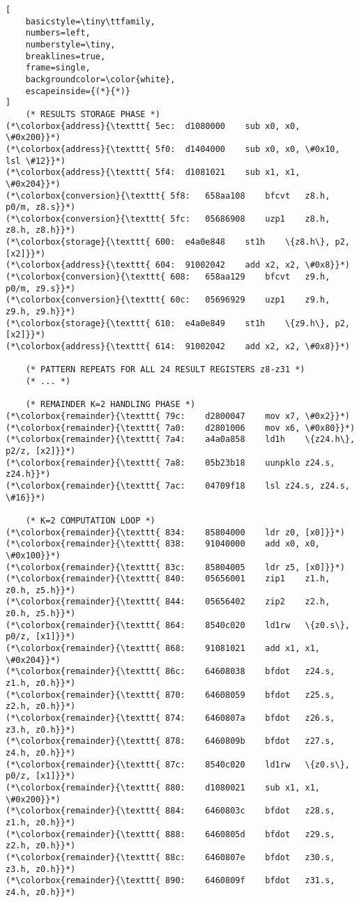 \documentclass[a4paper,10pt]{article}
\begin{document}
\begin{lstlisting}[
    basicstyle=\tiny\ttfamily,
    numbers=left,
    numberstyle=\tiny,
    breaklines=true,
    frame=single,
    backgroundcolor=\color{white},
    escapeinside={(*}{*)}
]
    (* RESULTS STORAGE PHASE *)
(*\colorbox{address}{\texttt{ 5ec:	d1080000 	sub	x0, x0, \#0x200}}*)
(*\colorbox{address}{\texttt{ 5f0:	d1404000 	sub	x0, x0, \#0x10, lsl \#12}}*)
(*\colorbox{address}{\texttt{ 5f4:	d1081021 	sub	x1, x1, \#0x204}}*)
(*\colorbox{conversion}{\texttt{ 5f8:	658aa108 	bfcvt	z8.h, p0/m, z8.s}}*)
(*\colorbox{conversion}{\texttt{ 5fc:	05686908 	uzp1	z8.h, z8.h, z8.h}}*)
(*\colorbox{storage}{\texttt{ 600:	e4a0e848 	st1h	\{z8.h\}, p2, [x2]}}*)
(*\colorbox{address}{\texttt{ 604:	91002042 	add	x2, x2, \#0x8}}*)
(*\colorbox{conversion}{\texttt{ 608:	658aa129 	bfcvt	z9.h, p0/m, z9.s}}*)
(*\colorbox{conversion}{\texttt{ 60c:	05696929 	uzp1	z9.h, z9.h, z9.h}}*)
(*\colorbox{storage}{\texttt{ 610:	e4a0e849 	st1h	\{z9.h\}, p2, [x2]}}*)
(*\colorbox{address}{\texttt{ 614:	91002042 	add	x2, x2, \#0x8}}*)

    (* PATTERN REPEATS FOR ALL 24 RESULT REGISTERS z8-z31 *)
    (* ... *)

    (* REMAINDER K=2 HANDLING PHASE *)
(*\colorbox{remainder}{\texttt{ 79c:	d2800047 	mov	x7, \#0x2}}*)
(*\colorbox{remainder}{\texttt{ 7a0:	d2801006 	mov	x6, \#0x80}}*)
(*\colorbox{remainder}{\texttt{ 7a4:	a4a0a858 	ld1h	\{z24.h\}, p2/z, [x2]}}*)
(*\colorbox{remainder}{\texttt{ 7a8:	05b23b18 	uunpklo	z24.s, z24.h}}*)
(*\colorbox{remainder}{\texttt{ 7ac:	04709f18 	lsl	z24.s, z24.s, \#16}}*)

    (* K=2 COMPUTATION LOOP *)
(*\colorbox{remainder}{\texttt{ 834:	85804000 	ldr	z0, [x0]}}*)
(*\colorbox{remainder}{\texttt{ 838:	91040000 	add	x0, x0, \#0x100}}*)
(*\colorbox{remainder}{\texttt{ 83c:	85804005 	ldr	z5, [x0]}}*)
(*\colorbox{remainder}{\texttt{ 840:	05656001 	zip1	z1.h, z0.h, z5.h}}*)
(*\colorbox{remainder}{\texttt{ 844:	05656402 	zip2	z2.h, z0.h, z5.h}}*)
(*\colorbox{remainder}{\texttt{ 864:	8540c020 	ld1rw	\{z0.s\}, p0/z, [x1]}}*)
(*\colorbox{remainder}{\texttt{ 868:	91081021 	add	x1, x1, \#0x204}}*)
(*\colorbox{remainder}{\texttt{ 86c:	64608038 	bfdot	z24.s, z1.h, z0.h}}*)
(*\colorbox{remainder}{\texttt{ 870:	64608059 	bfdot	z25.s, z2.h, z0.h}}*)
(*\colorbox{remainder}{\texttt{ 874:	6460807a 	bfdot	z26.s, z3.h, z0.h}}*)
(*\colorbox{remainder}{\texttt{ 878:	6460809b 	bfdot	z27.s, z4.h, z0.h}}*)
(*\colorbox{remainder}{\texttt{ 87c:	8540c020 	ld1rw	\{z0.s\}, p0/z, [x1]}}*)
(*\colorbox{remainder}{\texttt{ 880:	d1080021 	sub	x1, x1, \#0x200}}*)
(*\colorbox{remainder}{\texttt{ 884:	6460803c 	bfdot	z28.s, z1.h, z0.h}}*)
(*\colorbox{remainder}{\texttt{ 888:	6460805d 	bfdot	z29.s, z2.h, z0.h}}*)
(*\colorbox{remainder}{\texttt{ 88c:	6460807e 	bfdot	z30.s, z3.h, z0.h}}*)
(*\colorbox{remainder}{\texttt{ 890:	6460809f 	bfdot	z31.s, z4.h, z0.h}}*)


\end{lstlisting}
\end{document}
